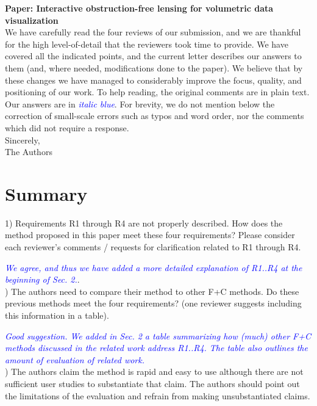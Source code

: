 \documentclass[a4paper,10pt]{article}
\newcommand{\rr}[1]{\emph{\textcolor{blue}{#1}}}
\begin{document}
\noindent\textbf{Paper: Interactive obstruction-free lensing for volumetric data visualization}\\

We have carefully read the four reviews of our submission, and we are thankful for the high level-of-detail that the reviewers took time to provide. We have covered all the
indicated points, and the current letter describes our answers to them (and, where needed, modifications done to the paper). We believe that by these changes we have managed to considerably improve the focus, quality, and positioning
of our work. To help reading, the original comments are in plain text. Our answers are in \rr{italic blue}. For brevity, we do not mention below the correction of small-scale errors such as typos and word order, nor the comments which did not require a response.\\

\noindent Sincerely,\\
The Authors\\


\section{Summary}


    1) Requirements R1 through R4 are not properly described. How does the method
    proposed in this paper meet these four requirements? Please consider each
    reviewer's comments / requests for clarification related to R1 through R4.
    
    \rr{We agree, and thus we have added a more detailed explanation of R1..R4 at the beginning of Sec. 2.}.\\

) The authors need to compare their method to other F+C methods. Do these
    previous methods meet the four requirements? (one reviewer suggests including this
    information in a table).
    
    \rr{Good suggestion. We added in Sec. 2 a table summarizing how (much) other F+C methods discussed in the related work address R1..R4. The table also outlines the amount of evaluation of related work.}\\

) The authors claim the method is rapid and easy to use although there are not sufficient user studies to substantiate that claim. The authors should point out the limitations of the evaluation and refrain from making unsubstantiated claims.
\end{document}
